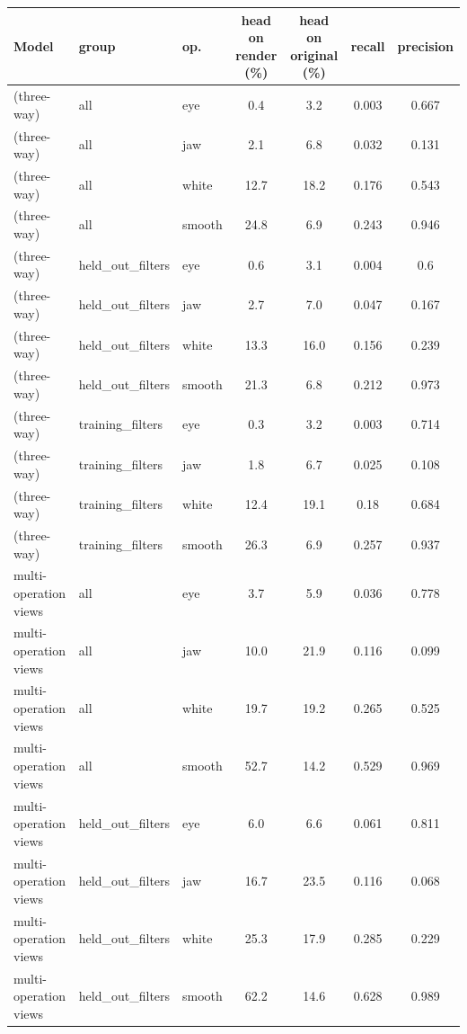 \begin{tabular}{@{}l l l cc cc@{}}
\toprule
Model & group & op. & head on render (\%) & head on original (\%) & recall & precision \\
\midrule
\ours{} (three-way) & all & eye & 0.4 & 3.2 & 0.003 & 0.667 \\
\ours{} (three-way) & all & jaw & 2.1 & 6.8 & 0.032 & 0.131 \\
\ours{} (three-way) & all & white & 12.7 & 18.2 & 0.176 & 0.543 \\
\ours{} (three-way) & all & smooth & 24.8 & 6.9 & 0.243 & 0.946 \\
\ours{} (three-way) & held\_out\_filters & eye & 0.6 & 3.1 & 0.004 & 0.6 \\
\ours{} (three-way) & held\_out\_filters & jaw & 2.7 & 7.0 & 0.047 & 0.167 \\
\ours{} (three-way) & held\_out\_filters & white & 13.3 & 16.0 & 0.156 & 0.239 \\
\ours{} (three-way) & held\_out\_filters & smooth & 21.3 & 6.8 & 0.212 & 0.973 \\
\ours{} (three-way) & training\_filters & eye & 0.3 & 3.2 & 0.003 & 0.714 \\
\ours{} (three-way) & training\_filters & jaw & 1.8 & 6.7 & 0.025 & 0.108 \\
\ours{} (three-way) & training\_filters & white & 12.4 & 19.1 & 0.18 & 0.684 \\
\ours{} (three-way) & training\_filters & smooth & 26.3 & 6.9 & 0.257 & 0.937 \\
multi-operation views & all & eye & 3.7 & 5.9 & 0.036 & 0.778 \\
multi-operation views & all & jaw & 10.0 & 21.9 & 0.116 & 0.099 \\
multi-operation views & all & white & 19.7 & 19.2 & 0.265 & 0.525 \\
multi-operation views & all & smooth & 52.7 & 14.2 & 0.529 & 0.969 \\
multi-operation views & held\_out\_filters & eye & 6.0 & 6.6 & 0.061 & 0.811 \\
multi-operation views & held\_out\_filters & jaw & 16.7 & 23.5 & 0.116 & 0.068 \\
multi-operation views & held\_out\_filters & white & 25.3 & 17.9 & 0.285 & 0.229 \\
multi-operation views & held\_out\_filters & smooth & 62.2 & 14.6 & 0.628 & 0.989 \\

\end{tabular}
